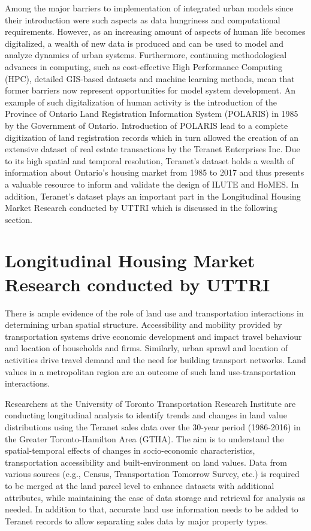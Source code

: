Among the major barriers to implementation of integrated urban models since their introduction were such aspects as data hungriness and computational requirements\cite{Miller1998}.
However, as an increasing amount of aspects of human life becomes digitalized, a wealth of new data is produced and can be used to model and analyze dynamics of urban systems\cite{Arribas-Bel2014,Chen2016}.
Furthermore, continuing methodological advances in computing, such as cost-effective High Performance Computing (HPC), detailed GIS-based datasets and machine learning methods, mean that former barriers now represent opportunities for model system development\cite{Miller2018a}.
An example of such digitalization of human activity is the introduction of the Province of Ontario Land Registration Information System (POLARIS) in 1985 by the Government of Ontario\cite{TeranetEnterprisesInc.}.
Introduction of POLARIS lead to a complete digitization of land registration records which in turn allowed the creation of an extensive dataset of real estate transactions by the Teranet Enterprises Inc.
Due to its high spatial and temporal resolution, Teranet's dataset holds a wealth of information about Ontario's housing market from 1985 to 2017 and thus presents a valuable resource to inform and validate the design of ILUTE and HoMES.
In addition, Teranet's dataset plays an important part in the Longitudinal Housing Market Research conducted by UTTRI which is discussed in the following section.

\section{Longitudinal Housing Market Research conducted by UTTRI} \label{sec:longitudinal_housing_market_research}

There is ample evidence of the role of land use and transportation interactions in determining urban spatial structure.
Accessibility and mobility provided by transportation systems drive economic development and impact travel behaviour and location of households and firms.
Similarly, urban sprawl and location of activities drive travel demand and the need for building transport networks.
Land values in a metropolitan region are an outcome of such land use-transportation interactions.

Researchers at the University of Toronto Transportation Research Institute are conducting longitudinal analysis to identify trends and changes in land value distributions using the Teranet sales data over the 30-year period (1986-2016) in the Greater Toronto-Hamilton Area (GTHA).
The aim is to understand the spatial-temporal effects of changes in socio-economic characteristics, transportation accessibility and built-environment on land values.
Data from various sources (e.g., Census, Transportation Tomorrow Survey, etc.) is required to be merged at the land parcel level to enhance datasets with additional attributes, while maintaining the ease of data storage and retrieval for analysis as needed.
In addition to that, accurate land use information needs to be added to Teranet records to allow separating sales data by major property types.

